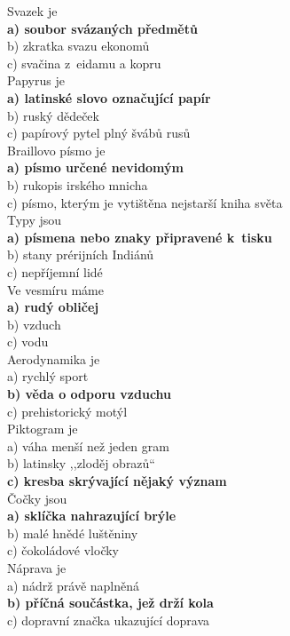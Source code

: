\begin{multicols}{4}
\noindent
Svazek je\\
\textbf{a) soubor svázaných předmětů}\\
b) zkratka svazu ekonomů\\
c) svačina z~eidamu a kopru\\

\noindent
Papyrus je\\
\textbf{a) latinské slovo označující papír}\\
b) ruský dědeček\\
c) papírový pytel plný švábů rusů\\

\noindent
Braillovo písmo je\\
\textbf{a) písmo určené nevidomým}\\
b) rukopis irského mnicha\\
c) písmo, kterým je vytištěna nejstarší kniha světa\\

\noindent
Typy jsou\\
\textbf{a) písmena nebo znaky připravené k~tisku}\\
b) stany prérijních Indiánů\\
c) nepříjemní lidé\\

\noindent
Ve vesmíru máme\\
\textbf{a) rudý obličej}\\
b) vzduch\\
c) vodu\\

\noindent
Aerodynamika je\\
a) rychlý sport\\
\textbf{b) věda o odporu vzduchu}\\
c) prehistorický motýl\\

\noindent
Piktogram je\\
a) váha menší než jeden gram\\
b) latinsky ,,zloděj obrazů``\\
\textbf{c) kresba skrývající nějaký význam}\\

\noindent
Čočky jsou\\
\textbf{a) sklíčka nahrazující brýle}\\
b) malé hnědé luštěniny\\
c) čokoládové vločky\\

\noindent
Náprava je\\
a) nádrž právě naplněná\\
\textbf{b) příčná součástka, jež drží kola}\\
c) dopravní značka ukazující doprava\\


\end{multicols}
